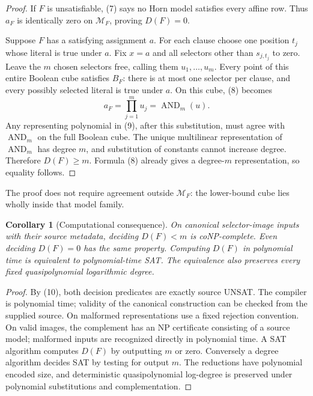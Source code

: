 \documentclass[11pt]{article}
\newtheorem{corollary}{Corollary}
\begin{document}
\begin{proof}
If $F$ is unsatisfiable, (7) says no Horn model satisfies every affine
row. Thus $a_F$ is identically zero on $\mathcal M_F$, proving
$D(F)=0$.

Suppose $F$ has a satisfying assignment $a$.
For each clause choose one position $t_j$ whose literal is true under $a$.
Fix $x=a$ and all selectors other than $s_{j,t_j}$ to zero.
Leave the $m$ chosen selectors free, calling them $u_1,\ldots,u_m$.
Every point of this entire Boolean cube satisfies $B_F$:
there is at most one selector per clause, and every possibly selected
literal is true under $a$.
On this cube, (8) becomes
\[
 a_F=\prod_{j=1}^m u_j=\operatorname{AND}_m(u).
\]
Any representing polynomial in (9), after this substitution, must agree
with $\operatorname{AND}_m$ on the full Boolean cube.
The unique multilinear representation of $\operatorname{AND}_m$
has degree $m$, and substitution of constants cannot increase degree.
Therefore $D(F)\ge m$. Formula (8) already gives a degree-$m$
representation, so equality follows.
\end{proof}

The proof does not require agreement outside $\mathcal M_F$:
the lower-bound cube lies wholly inside that model family.

\begin{corollary}[Computational consequence]\label{cor:degree}
On canonical selector-image inputs with their source metadata,
deciding $D(F)<m$ is coNP-complete. Even deciding $D(F)=0$
has the same property. Computing $D(F)$ in polynomial time is
equivalent to polynomial-time SAT.
The equivalence also preserves every fixed quasipolynomial
logarithmic degree.
\end{corollary}

\begin{proof}
By (10), both decision predicates are exactly source UNSAT.
The compiler is polynomial time; validity of the canonical construction
can be checked from the supplied source. On malformed representations
use a fixed rejection convention.
On valid images, the complement has an NP certificate consisting of
a source model; malformed inputs are recognized directly in polynomial time.
A SAT algorithm computes $D(F)$ by outputting $m$ or zero.
Conversely a degree algorithm decides SAT by testing for output $m$.
The reductions have polynomial encoded size, and deterministic
quasipolynomial log-degree is preserved under polynomial substitutions
and complementation.
\end{proof}
\end{document}
